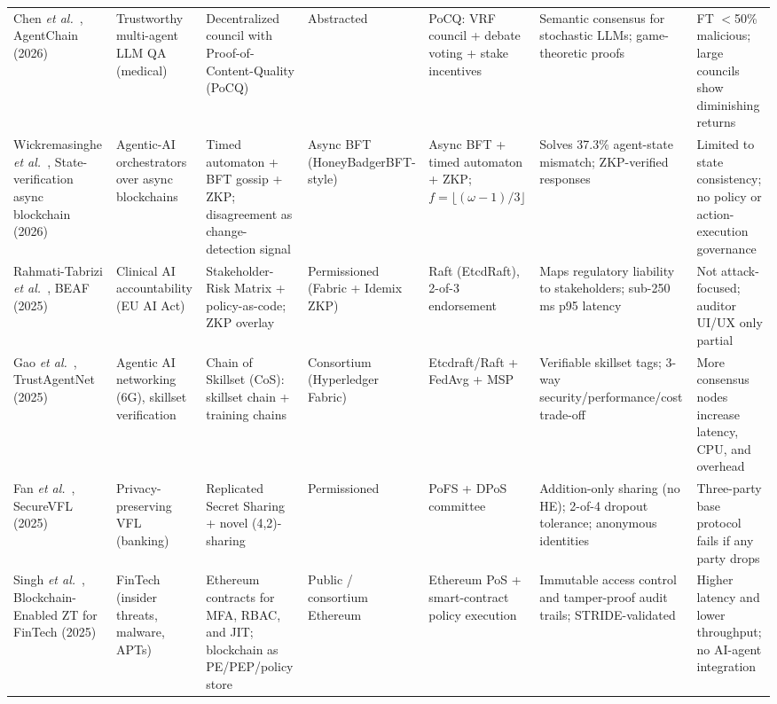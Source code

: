 \documentclass[10pt, conference]{IEEEtran}
\begin{document}
\begin{strip}
\begin{tabularx}{\textwidth}{@{}YYYYYYY@{}}
Chen \textit{et al.}~\cite{chen2026agentchain}, AgentChain (2026) & Trustworthy multi-agent LLM QA (medical) & Decentralized council with Proof-of-Content-Quality (PoCQ) & Abstracted & PoCQ: VRF council + debate voting + stake incentives & Semantic consensus for stochastic LLMs; game-theoretic proofs & FT $<$50\% malicious; large councils show diminishing returns \\
Wickremasinghe \textit{et al.}~\cite{wickremasinghe2026state}, State-verification async blockchain (2026) & Agentic-AI orchestrators over async blockchains & Timed automaton + BFT gossip + ZKP; disagreement as change-detection signal & Async BFT (HoneyBadgerBFT-style) & Async BFT + timed automaton + ZKP; $f=\lfloor(\omega-1)/3\rfloor$ & Solves 37.3\% agent-state mismatch; ZKP-verified responses & Limited to state consistency; no policy or action-execution governance \\
Rahmati-Tabrizi \textit{et al.}~\cite{rahmati2025beaf}, BEAF (2025) & Clinical AI accountability (EU AI Act) & Stakeholder-Risk Matrix + policy-as-code; ZKP overlay & Permissioned (Fabric + Idemix ZKP) & Raft (EtcdRaft), 2-of-3 endorsement & Maps regulatory liability to stakeholders; sub-250\,ms p95 latency & Not attack-focused; auditor UI/UX only partial \\
Gao \textit{et al.}~\cite{gao2025trustagentnet}, TrustAgentNet (2025) & Agentic AI networking (6G), skillset verification & Chain of Skillset (CoS): skillset chain + training chains & Consortium (Hyperledger Fabric) & Etcdraft/Raft + FedAvg + MSP & Verifiable skillset tags; 3-way security/performance/cost trade-off & More consensus nodes increase latency, CPU, and overhead \\


Fan \textit{et al.}~\cite{fan2025}, SecureVFL (2025) & Privacy-preserving VFL (banking) & Replicated Secret Sharing + novel (4,2)-sharing & Permissioned & PoFS + DPoS committee & Addition-only sharing (no HE); 2-of-4 dropout tolerance; anonymous identities & Three-party base protocol fails if any party drops \\

Singh \textit{et al.}~\cite{singh2025zt}, Blockchain-Enabled ZT for FinTech (2025) & FinTech (insider threats, malware, APTs) & Ethereum contracts for MFA, RBAC, and JIT; blockchain as PE/PEP/policy store & Public / consortium Ethereum & Ethereum PoS + smart-contract policy execution & Immutable access control and tamper-proof audit trails; STRIDE-validated & Higher latency and lower throughput; no AI-agent integration \\
\bottomrule
\end{tabularx}
\end{strip}
\end{document}
